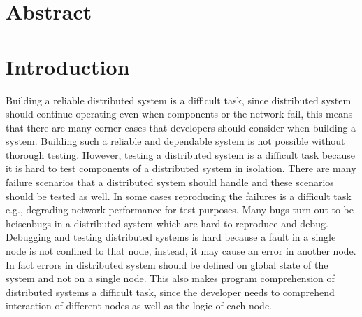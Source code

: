 \section{Abstract}
\section{Introduction}

Building a reliable distributed system is a difficult task, since distributed system should continue operating even when components or the network fail, this means that there are many corner cases that developers should consider when building a system. Building such 
a reliable and dependable system is not possible without thorough testing. However, testing a distributed system is a difficult task because it is hard to test components of a distributed system in isolation. There are many 
failure scenarios that a distributed system should handle and these scenarios should be tested as well. In some cases reproducing the failures is a difficult task e.g., degrading network performance for test purposes. Many bugs turn out to be heisenbugs in a distributed 
system which are hard to reproduce and debug. Debugging and testing distributed systems is hard because a fault in a single node is not confined to that node, instead, it may cause an error in another node. In fact errors in distributed system should be defined on global state of the system and not on a single node. This also makes program comprehension of distributed systems a difficult task, since the developer needs to comprehend interaction of different nodes as well as the logic of each node.

